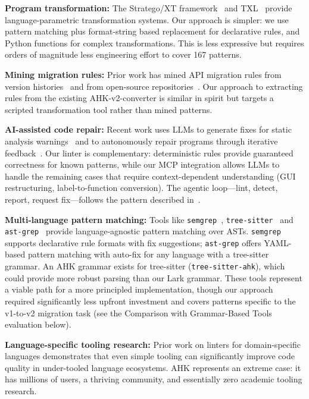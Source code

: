 \documentclass[11pt,a4paper]{article}
\begin{document}
\textbf{Program transformation:} The Stratego/XT framework~\cite{stratego} and TXL~\cite{txl} provide language-parametric transformation systems. Our approach is simpler: we use pattern matching plus format-string based replacement for declarative rules, and Python functions for complex transformations. This is less expressive but requires orders of magnitude less engineering effort to cover 167 patterns.

\textbf{Mining migration rules:} Prior work has mined API migration rules from version histories~\cite{api_migration} and from open-source repositories~\cite{libsync}. Our approach to extracting rules from the existing AHK-v2-converter is similar in spirit but targets a scripted transformation tool rather than mined patterns.

\textbf{AI-assisted code repair:} Recent work uses LLMs to generate fixes for static analysis warnings~\cite{fan2024survey} and to autonomously repair programs through iterative feedback~\cite{bouzenia2024repair}. Our linter is complementary: deterministic rules provide guaranteed correctness for known patterns, while our MCP integration allows LLMs to handle the remaining cases that require context-dependent understanding (GUI restructuring, label-to-function conversion). The agentic loop---lint, detect, report, request fix---follows the pattern described in~\cite{mcp}.

\textbf{Multi-language pattern matching:} Tools like \texttt{semgrep}~\cite{semgrep}, \texttt{tree-sitter}~\cite{treesitter} and \texttt{ast-grep}~\cite{astgrep} provide language-agnostic pattern matching over ASTs. \texttt{semgrep} supports declarative rule formats with fix suggestions; \texttt{ast-grep} offers YAML-based pattern matching with auto-fix for any language with a tree-sitter grammar. An AHK grammar exists for tree-sitter (\texttt{tree-sitter-ahk}), which could provide more robust parsing than our Lark grammar. These tools represent a viable path for a more principled implementation, though our approach required significantly less upfront investment and covers patterns specific to the v1-to-v2 migration task (see the Comparison with Grammar-Based Tools evaluation below).

\textbf{Language-specific tooling research:} Prior work on linters for domain-specific languages demonstrates that even simple tooling can significantly improve code quality in under-tooled language ecosystems. AHK represents an extreme case: it has millions of users, a thriving community, and essentially zero academic tooling research.
\end{document}
